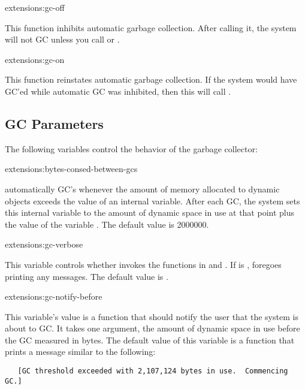 \begin{defun}{extensions:}{gc-off}{}
  
  This function inhibits automatic garbage collection.  After calling
  it, the system will not GC unless you call  or
  .
\end{defun}

\begin{defun}{extensions:}{gc-on}{}
  
  This function reinstates automatic garbage collection.  If the
  system would have GC'ed while automatic GC was inhibited, then this
  will call .
\end{defun}

\subsection{GC Parameters}

The following variables control the behavior of the garbage collector:

\begin{defvar}{extensions:}{bytes-consed-between-gcs}
  
  \cmucl{} automatically GC's whenever the amount of memory
  allocated to dynamic objects exceeds the value of an internal
  variable.  After each GC, the system sets this internal variable to
  the amount of dynamic space in use at that point plus the value of
  the variable .  The default
  value is 2000000.
\end{defvar}

\begin{defvar}{extensions:}{gc-verbose}
  
  This variable controls whether  invokes the functions
  in  and
  .  If  is \nil,
   foregoes printing any messages.  The default value is
  .
\end{defvar}

\begin{defvar}{extensions:}{gc-notify-before}
  
  This variable's value is a function that should notify the user that
  the system is about to GC.  It takes one argument, the amount of
  dynamic space in use before the GC measured in bytes.  The default
  value of this variable is a function that prints a message similar
  to the following:
\begin{verbatim}
   [GC threshold exceeded with 2,107,124 bytes in use.  Commencing GC.]
\end{verbatim}
\end{defvar}

